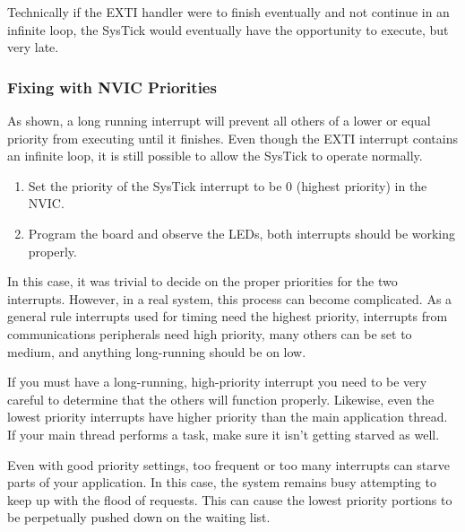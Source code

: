 \documentclass[11pt,fleqn]{book} %
\begin{document}
Technically if the EXTI handler were to finish eventually and not continue in an infinite loop, the SysTick would eventually have the opportunity to execute, but very late.    

\subsubsection{Fixing with NVIC Priorities}

As shown, a long running interrupt will prevent all others of a lower or equal priority from executing until it finishes. Even though the EXTI interrupt contains an infinite loop, it is still possible to allow the SysTick to operate normally. 

\begin{enumerate}
    \item Set the priority of the SysTick interrupt to be 0 (highest priority) in the NVIC.
    \item Program the board and observe the LEDs, both interrupts should be working properly.
\end{enumerate}

In this case, it was trivial to decide on the proper priorities for the two interrupts. However, in a real system, this process can become complicated. As a general rule interrupts used for timing need the highest priority, interrupts from communications peripherals need high priority, many others can be set to medium, and anything long-running should be on low. 

If you must have a long-running, high-priority interrupt you need to be very careful to determine that the others will function properly. Likewise, even the lowest priority interrupts have higher priority than the main application thread. If your main thread performs a task, make sure it isn't getting starved as well. 

Even with good priority settings, too frequent or too many interrupts can starve parts of your application. In this case, the system remains busy attempting to keep up with the flood of requests. This can cause the lowest priority portions to be perpetually pushed down on the waiting list.
\end{document}
